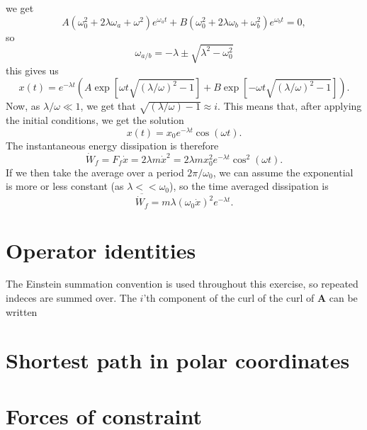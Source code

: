 \documentclass{article}
\begin{document}
        we get
        \begin{equation*}
            A(\omega_0^2 + 2 \lambda \omega_a + \omega^2)e^{\omega_a t} + B(\omega_0^2 + 2 \lambda \omega_b + \omega_b^2)e^{\omega_b t} = 0,
        \end{equation*}
        so
        \begin{equation*}
            \omega_{a/b} = -\lambda \pm \sqrt{\lambda^2 - \omega_0^2}
        \end{equation*}
        this gives us
        \begin{equation*}
            x(t) = e^{-\lambda t} \left( A \exp \left[\omega t \sqrt{(\lambda / \omega)^2 - 1} \right] + B \exp \left[- \omega t \sqrt{(\lambda / \omega)^2 - 1} \right] \right).
        \end{equation*}
        Now, as $\lambda/\omega \ll 1$, we get that $\sqrt{(\lambda / \omega) - 1} \approx i$. This means that, after applying the initial conditions, we get the solution
        \begin{equation*}
            x(t) = x_0 e^{-\lambda t} \cos(\omega t).
        \end{equation*}
        The instantaneous energy dissipation is therefore 
        \begin{equation*}
            \dot W_f = F_f \dot x = 2 \lambda m \dot x^2 = 2 \lambda m x_0^2 e^{-\lambda t} \cos^2(\omega t).
        \end{equation*}
        If we then take the average over a period $2 \pi / \omega_0$, we can assume the exponential is more or less constant (as $\lambda << \omega_0$), so the time averaged dissipation is 
        \begin{equation*}
            \overline{\dot W_f} = m \lambda (\omega_0 \dot x)^2 e^{-\lambda t}.
        \end{equation*}

    \section{Operator identities}
        The Einstein summation convention is used throughout this exercise, so repeated indeces are summed over. The $i$'th component of the curl of the curl of $\mathbf{A}$ can be written
        \begin{equation*}
            
        \end{equation*}

    \section{Shortest path in polar coordinates}

    \section{Forces of constraint}
\end{document}
